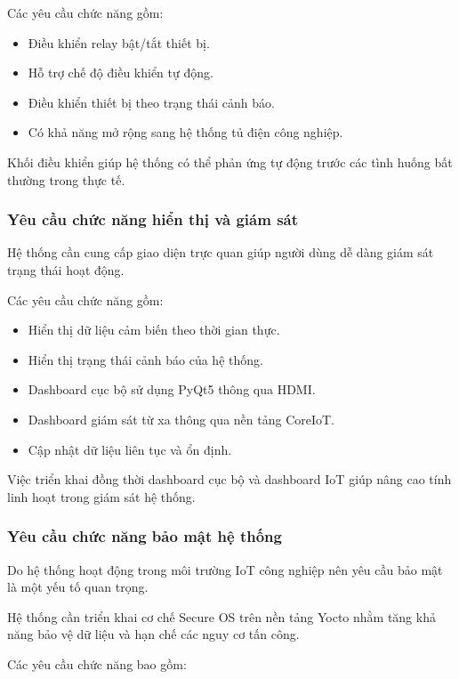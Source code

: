 Các yêu cầu chức năng gồm:


\begin{itemize}
    \item Điều khiển relay bật/tắt thiết bị.
    \item Hỗ trợ chế độ điều khiển tự động.
    \item Điều khiển thiết bị theo trạng thái cảnh báo.
    \item Có khả năng mở rộng sang hệ thống tủ điện công nghiệp.
\end{itemize}


Khối điều khiển giúp hệ thống có thể phản ứng tự động trước các tình huống bất thường trong thực tế.


\subsubsection{Yêu cầu chức năng hiển thị và giám sát}


Hệ thống cần cung cấp giao diện trực quan giúp người dùng dễ dàng giám sát trạng thái hoạt động.


Các yêu cầu chức năng gồm:


\begin{itemize}
    \item Hiển thị dữ liệu cảm biến theo thời gian thực.
    \item Hiển thị trạng thái cảnh báo của hệ thống.
    \item Dashboard cục bộ sử dụng PyQt5 thông qua HDMI.
    \item Dashboard giám sát từ xa thông qua nền tảng CoreIoT.
    \item Cập nhật dữ liệu liên tục và ổn định.
\end{itemize}


Việc triển khai đồng thời dashboard cục bộ và dashboard IoT giúp nâng cao tính linh hoạt trong giám sát hệ thống.


\subsubsection{Yêu cầu chức năng bảo mật hệ thống}


Do hệ thống hoạt động trong môi trường IoT công nghiệp nên yêu cầu bảo mật là một yếu tố quan trọng.


Hệ thống cần triển khai cơ chế Secure OS trên nền tảng Yocto nhằm tăng khả năng bảo vệ dữ liệu và hạn chế các nguy cơ tấn công.


Các yêu cầu chức năng bao gồm:


